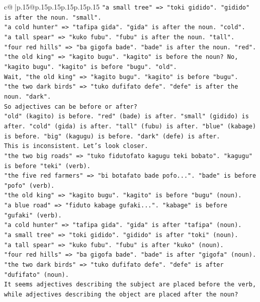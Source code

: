 \documentclass{article}
\begin{document}
{\begin{supertabular}{c@{$\;$}|p{.15\linewidth}@{}p{.15\linewidth}p{.15\linewidth}p{.15\linewidth}p{.15\linewidth}p{.15\linewidth}}
{{{\texttt{"a small tree" => "toki gidido". "gidido" is after the noun. "small".} \\
\texttt{"a cold hunter" => "tafipa gida". "gida" is after the noun. "cold".} \\
\texttt{"a tall spear" => "kuko fubu". "fubu" is after the noun. "tall".} \\
\texttt{"four red hills" => "ba gigofa bade". "bade" is after the noun. "red".} \\
\texttt{"the old king" => "kagito bugu". "kagito" is before the noun? No, "kagito bugu". "kagito" is before "bugu". "old".} \\
\texttt{Wait, "the old king" => "kagito bugu". "kagito" is before "bugu".} \\
\texttt{"the two dark birds" => "tuko dufifato defe". "defe" is after the noun. "dark".} \\
\texttt{So adjectives can be before or after?} \\
\texttt{"old" (kagito) is before. "red" (bade) is after. "small" (gidido) is after. "cold" (gida) is after. "tall" (fubu) is after. "blue" (kabage) is before. "big" (kagugu) is before. "dark" (defe) is after.} \\
\texttt{This is inconsistent. Let's look closer.} \\
\texttt{"the two big roads" => "tuko fidutofato kagugu teki bobato". "kagugu" is before "teki" (verb).} \\
\texttt{"the five red farmers" => "bi botafato bade pofo...". "bade" is before "pofo" (verb).} \\
\texttt{"the old king" => "kagito bugu". "kagito" is before "bugu" (noun).} \\
\texttt{"a blue road" => "fiduto kabage gufaki...". "kabage" is before "gufaki" (verb).} \\
\texttt{"a cold hunter" => "tafipa gida". "gida" is after "tafipa" (noun).} \\
\texttt{"a small tree" => "toki gidido". "gidido" is after "toki" (noun).} \\
\texttt{"a tall spear" => "kuko fubu". "fubu" is after "kuko" (noun).} \\
\texttt{"four red hills" => "ba gigofa bade". "bade" is after "gigofa" (noun).} \\
\texttt{"the two dark birds" => "tuko dufifato defe". "defe" is after "dufifato" (noun).} \\
\texttt{It seems adjectives describing the subject are placed before the verb, while adjectives describing the object are placed after the noun?} \\
}}}
\end{supertabular}}
\end{document}
